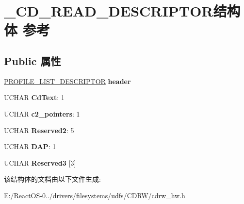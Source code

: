 \hypertarget{struct___c_d___r_e_a_d___d_e_s_c_r_i_p_t_o_r}{}\section{\+\_\+\+C\+D\+\_\+\+R\+E\+A\+D\+\_\+\+D\+E\+S\+C\+R\+I\+P\+T\+O\+R结构体 参考}
\label{struct___c_d___r_e_a_d___d_e_s_c_r_i_p_t_o_r}
\subsection*{Public 属性}
\begin{DoxyCompactItemize}
\item 
\mbox{\label{struct___c_d___r_e_a_d___d_e_s_c_r_i_p_t_o_r_a73c852aa0903170fb7f42bae67012b89}} 
\hyperlink{struct___p_r_o_f_i_l_e___l_i_s_t___d_e_s_c_r_i_p_t_o_r}{P\+R\+O\+F\+I\+L\+E\+\_\+\+L\+I\+S\+T\+\_\+\+D\+E\+S\+C\+R\+I\+P\+T\+OR} {\bfseries header}
\item 
\mbox{\label{struct___c_d___r_e_a_d___d_e_s_c_r_i_p_t_o_r_a38f9a84e29047aca2736afcbe131056a}} 
U\+C\+H\+AR {\bfseries Cd\+Text}\+: 1
\item 
\mbox{\label{struct___c_d___r_e_a_d___d_e_s_c_r_i_p_t_o_r_ae532789650b5b874a61397ab3381b277}} 
U\+C\+H\+AR {\bfseries c2\+\_\+pointers}\+: 1
\item 
\mbox{\label{struct___c_d___r_e_a_d___d_e_s_c_r_i_p_t_o_r_ab74e5ca3545557bb6b26b3b508544214}} 
U\+C\+H\+AR {\bfseries Reserved2}\+: 5
\item 
\mbox{\label{struct___c_d___r_e_a_d___d_e_s_c_r_i_p_t_o_r_a642554bebafa2358cb5ebb7630a2d97b}} 
U\+C\+H\+AR {\bfseries D\+AP}\+: 1
\item 
\mbox{\label{struct___c_d___r_e_a_d___d_e_s_c_r_i_p_t_o_r_ae388d5e48bd731f256b506ebdef92fb2}} 
U\+C\+H\+AR {\bfseries Reserved3} \mbox{[}3\mbox{]}
\end{DoxyCompactItemize}


该结构体的文档由以下文件生成\+:\begin{DoxyCompactItemize}
\item 
E\+:/\+React\+O\+S-\/0../drivers/filesystems/udfs/\+C\+D\+R\+W/cdrw\+\_\+hw.\+h\end{DoxyCompactItemize}
